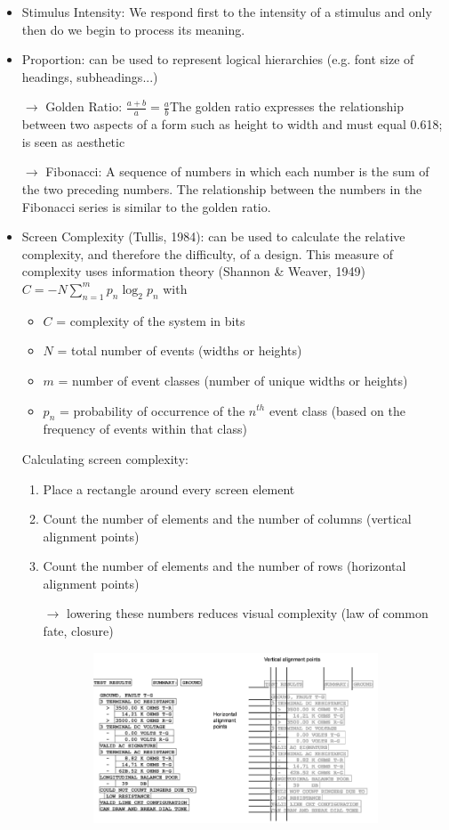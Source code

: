 \begin{itemize}
\item Stimulus Intensity: We respond first to the intensity of a stimulus and only then do we begin to process its meaning.
\item Proportion: can be used to represent logical hierarchies (e.g. font size of headings, subheadings...)
\item[$\rightarrow$] Golden Ratio: $\frac{a+b}{a}=\frac{a}{b}$The golden ratio expresses the relationship between two aspects of a form such as height to width and must equal 0.618; is seen as aesthetic
\item[$\rightarrow$] Fibonacci: A sequence of numbers in which each number is the sum of the two preceding numbers. The relationship between the numbers in the Fibonacci series is similar to the golden ratio.
\item Screen Complexity (Tullis, 1984): can be used to calculate the relative complexity, and therefore the difficulty, of a design. This measure of complexity uses information theory (Shannon \& Weaver, 1949) $C = -N \sum\limits_{n=1}^m p_n \log_2 p_n$ with 
\begin{itemize}
\item $C$ = complexity of the system in bits
\item $N$ = total number of events (widths or heights)
\item $m$ = number of event classes (number of unique widths or heights)
\item $p_n$ = probability of occurrence of the $n^{th}$ event class (based on the frequency of events within that class)
\end{itemize}
Calculating screen complexity:
\begin{enumerate}
\item Place a rectangle around every screen element
\item Count the number of elements and the number of columns (vertical alignment points)
\item Count the number of elements and the number of rows (horizontal alignment points) 
\item[$\rightarrow$] lowering these numbers reduces visual complexity (law of common fate, closure) 
\end{enumerate}
\begin{figure}[h!]
	\begin{subfigure}{.7\textwidth}
	\centering
	\includegraphics[width=.7\textwidth]{img/ch04_sc}

\end{subfigure}
\end{figure}
\end{itemize}
